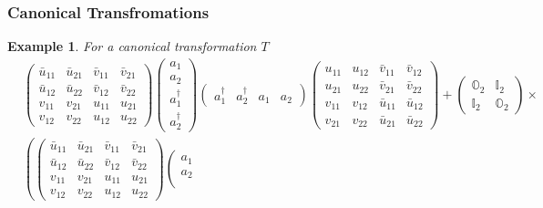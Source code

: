 \documentclass[aps, preprint]{revtex4}
\newtheorem{example}[theorem]{Example}
\begin{document}
\subsubsection{Canonical Transfromations}
\begin{example}
For a canonical transformation $T$
\begin{align} & \left (\begin{array}{cccc}\bar{u}_{1 1} & \bar{u}_{2 1} & \bar{v}_{1 1} & \bar{v}_{2 1} \\
\bar{u}_{1 2} & \bar{u}_{2 2} & \bar{v}_{1 2} & \bar{v}_{2 2} \\
v_{1 1} & v_{2 1} & u_{1 1} & u_{2 1} \\
v_{1 2} & v_{2 2} & u_{1 2} & u_{2 2}\end{array}\right ) \left (\begin{array}{c}a_{1} \\
a_{2} \\
a_{1}^{ \dag } \\
a_{2}^{ \dag }\end{array}\right ) \left (\begin{array}{cccc}a_{1}^{ \dag } & a_{2}^{ \dag } & a_{1} & a_{2}\end{array}\right ) \left (\begin{array}{cccc}u_{1 1} & u_{1 2} & \bar{v}_{1 1} & \bar{v}_{1 2} \\
u_{2 1} & u_{2 2} & \bar{v}_{2 1} & \bar{v}_{2 2} \\
v_{1 1} & v_{1 2} & \bar{u}_{1 1} & \bar{u}_{1 2} \\
v_{2 1} & v_{2 2} & \bar{u}_{2 1} & \bar{u}_{2 2}\end{array}\right ) +\left (\begin{array}{cc}\mathbb{O}_{2} & \mathbb{I}_{2} \\
\mathbb{I}_{2} & \mathbb{O}_{2}\end{array}\right ) \times  \nonumber  \\
 & \left (\left (\begin{array}{cccc}\bar{u}_{1 1} & \bar{u}_{2 1} & \bar{v}_{1 1} & \bar{v}_{2 1} \\
\bar{u}_{1 2} & \bar{u}_{2 2} & \bar{v}_{1 2} & \bar{v}_{2 2} \\
v_{1 1} & v_{2 1} & u_{1 1} & u_{2 1} \\
v_{1 2} & v_{2 2} & u_{1 2} & u_{2 2}\end{array}\right ) \left (\begin{array}{c}a_{1} \\
a_{2} \\

\end{array}
\end{align}
\end{example}
\end{document}
